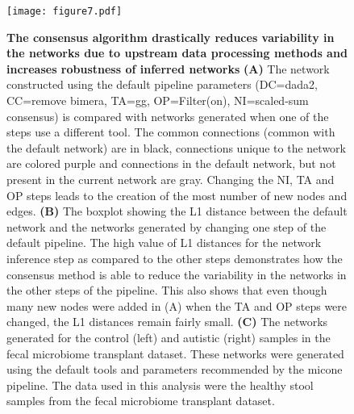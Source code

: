   \begin{figure}[H]
    \centering
    \texttt{[image: figure7.pdf]}
  \end{figure}
  \begin{figure}[H]
    \centering
    \caption{
      \textbf{The consensus algorithm drastically reduces variability in the networks due to upstream data processing methods and increases robustness of inferred networks}
      \textbf{(A)} The network constructed using the default pipeline parameters (DC=\ac{dada2}, CC=remove bimera, TA=\ac{gg}, OP=Filter(on), NI=scaled-sum consensus) is compared with networks generated when one of the steps use a different tool.
      The common connections (common with the default network) are in black, connections unique to the network are colored purple and connections in the default network, but not present in the current network are gray.
      Changing the NI, TA and OP steps leads to the creation of the most number of new nodes and edges.
      \textbf{(B)} The boxplot showing the L1 distance between the default network and the networks generated by changing one step of the default pipeline.
      The high value of L1 distances for the network inference step as compared to the other steps demonstrates how the consensus method is able to reduce the variability in the networks in the other steps of the pipeline.
      This also shows that even though many new nodes were added in (A) when the TA and OP steps were changed, the L1 distances remain fairly small.
      \textbf{(C)} The networks generated for the control (left) and autistic (right) samples in the fecal microbiome transplant dataset.
      These networks were generated using the default tools and parameters recommended by the \ac{micone} pipeline.
      The data used in this analysis were the healthy stool samples from the fecal microbiome transplant dataset.
    }
    \label{fig:figure7}
  \end{figure}
